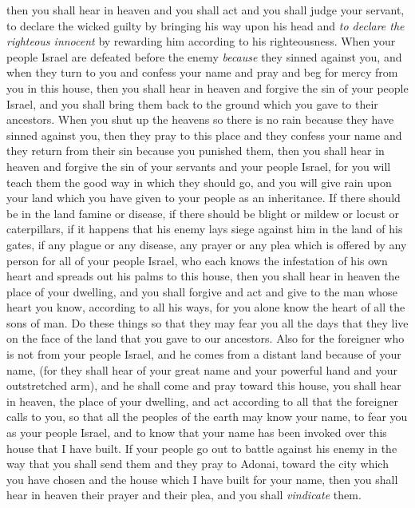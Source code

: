 \begin{biblechapter}
\verse then you shall hear in heaven and you shall act and you shall judge your servant, to declare the wicked guilty by bringing his way upon his head and \textit{to declare the righteous innocent} by rewarding him according to his righteousness.
\verse When your people Israel are defeated before the enemy \textit{because} they sinned against you, and when they turn to you and confess your name and pray and beg for mercy from you in this house,
\verse then you shall hear in heaven and forgive the sin of your people Israel, and you shall bring them back to the ground which you gave to their ancestors.
\verse When you shut up the heavens so there is no rain because they have sinned against you, then they pray to this place and they confess your name and they return from their sin because you punished them,
\verse then you shall hear in heaven and forgive the sin of your servants and your people Israel, for you will teach them the good way in which they should go, and you will give rain upon your land which you have given to your people as an inheritance.
\verse If there should be in the land famine or disease, if there should be blight or mildew or locust or caterpillars, if it happens that his enemy lays siege against him in the land of his gates, if any plague or any disease,
\verse any prayer or any plea which is offered by any person for all of your people Israel, who each knows the infestation of his own heart and spreads out his palms to this house,
\verse then you shall hear in heaven the place of your dwelling, and you shall forgive and act and give to the man whose heart you know, according to all his ways, for you alone know the heart of all the sons of man.
\verse Do these things so that they may fear you all the days that they live on the face of the land that you gave to our ancestors.
\verse Also for the foreigner who is not from your people Israel, and he comes from a distant land because of your name,
\verse (for they shall hear of your great name and your powerful hand and your outstretched arm), and he shall come and pray toward this house,
\verse you shall hear in heaven, the place of your dwelling, and act according to all that the foreigner calls to you, so that all the peoples of the earth may know your name, to fear you as your people Israel, and to know that your name has been invoked over this house that I have built.
\verse If your people go out to battle against his enemy in the way that you shall send them and they pray to Adonai, toward the city which you have chosen and the house which I have built for your name,
\verse then you shall hear in heaven their prayer and their plea, and you shall \textit{vindicate} them.

\end{biblechapter}
